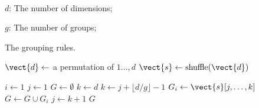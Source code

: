 \begin{algorithmic}[1]
    \REQUIRE~\\
    
    $d$: The number of dimensions;
    
    $g$: The number of groups;
    
    \ENSURE The grouping rules.

    \STATE $\vect{d} \leftarrow$ a permutation of $1 \dots, d$
    \STATE $\vect{s} \leftarrow \operatorname{shuffle}(\vect{d})$
    
    \STATE $i \leftarrow 1$
    \STATE $j \leftarrow 1$
    \STATE $G \leftarrow \emptyset$
            \STATE $k \leftarrow d$
        \ELSE
            \STATE $k \leftarrow j + \lfloor d / g \rfloor - 1$
        \ENDIF
        \STATE $G_i \leftarrow \vect{s}[j, \dots, k]$
        \STATE $G \leftarrow G \cup G_i$
        \STATE $j \leftarrow k + 1$
    \ENDWHILE
\RETURN $G$
\end{algorithmic}